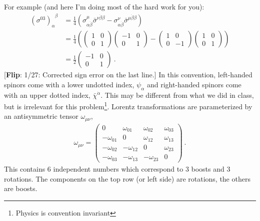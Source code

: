 \documentclass[12pt]{article}
\newcommand{\flip}[1]{{\color{red} [\textbf{Flip}: {#1}]}}
\begin{document}
For example (and here I'm doing most of the hard work for you):
\begin{align}
	\left(\sigma^{03}\right)_\alpha^{\phantom\alpha \beta}
	&= 
	\frac 14 
	\left(
		\sigma^\mu_{\alpha\dot\beta} \bar\sigma^{\nu \dot\beta \beta}
		- 
		\sigma^\nu_{\alpha\dot\beta}\bar\sigma^{\mu \dot\beta \beta}
	\right)
	\\
	&=
	\frac 14 \left(
		\begin{pmatrix}
		 1 &  0\\
		 0 &  1
	\end{pmatrix}
	\begin{pmatrix}
		-1 &  0\\
		 0 &  1
	\end{pmatrix}
	-
	\begin{pmatrix}
		 1 &  0\\
		 0 & -1
	\end{pmatrix}
	\begin{pmatrix}
		1 &  0\\
		 0 &  1
	\end{pmatrix}
	\right) %
	\\
	&=
	\frac 12
	\begin{pmatrix}
		-1 &  0\\
		 0 &  1
	\end{pmatrix}
 \ .
\end{align}
\flip{1/27: Corrected sign error on the last line.}
In this convention, left-handed spinors come with a lower undotted index, $\psi_\alpha$ and right-handed spinors come with an upper dotted index, $\bar\chi^{\dot\alpha}$. This may be different from what we did in class, but is irrelevant for this problem\footnote{Physics is convention invariant}. Lorentz transformations are parameterized by an antisymmetric tensor $\omega_{\mu\nu}$,
\begin{align}
	\omega_{\mu\nu} = 
	\begin{pmatrix}
		0 & \omega_{01} & \omega_{02} & \omega_{03} \\
		-\omega_{01} & 0 & \omega_{12} & \omega_{13} \\
		- \omega_{02} & - \omega_{12} & 0 & \omega_{23} \\
		-\omega_{03} & - \omega_{13} & - \omega_{23} & 0
	\end{pmatrix} \ .
\end{align}
This contains 6 independent numbers which correspond to 3 boosts and 3 rotations. The components on the top row (or left side) are rotations, the others are boosts. 
%
\end{document}
